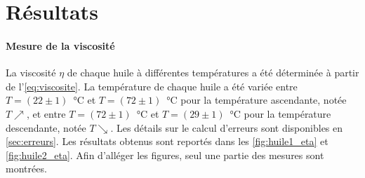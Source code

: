 \section{Résultats}

\paragraph{Mesure de la viscosité} La viscosité \(\eta\) de chaque huile à différentes températures a été déterminée à partir de l'\autoref{eq:viscosite}. La température de chaque huile a été variée entre \mbox{\(T=(22 \pm 1)\) \si{\celsius}} et \mbox{\(T=(72 \pm 1)\) \si{\celsius}} pour la température ascendante, notée \(T\nearrow\), et entre \mbox{\(T=(72 \pm 1)\) \si{\celsius}} et \mbox{\(T=(29 \pm 1)\) \si{\celsius}} pour la température descendante, notée \(T\searrow\). Les détails sur le calcul d'erreurs sont disponibles en \autoref{sec:erreurs}. Les résultats obtenus sont reportés dans les \autoref{fig:huile1_eta} et \autoref{fig:huile2_eta}. Afin d'alléger les figures, seul une partie des mesures sont montrées.

